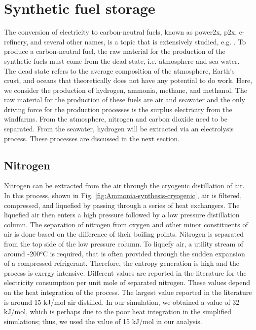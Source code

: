 \documentclass{ECOS_2021}
\begin{document}
\sffamily \section{Synthetic fuel storage}
\normalsize

The conversion of electricity to carbon-neutral fuels, known as power2x,
p2x, e-refinery, and several other names, is a topic that is extensively
studied, e.g. \cite{freiMethanolHydrogenCarrier2020b,ghaibPowertoMethaneStateoftheartReview2018,guerraMethaneProductionCombined2018,koponenReviewWaterElectrolysis2015,mendoza-hernandezExergyValorizationWater2019}.
To produce a carbon-neutral fuel, the raw material for the production
of the synthetic fuels must come from the dead state, i.e. atmosphere
and sea water. The dead state refers to the average composition of
the atmosphere, Earth's crust, and oceans that theoretically does
not have any potential to do work. Here, we consider the production
of hydrogen, ammonia, methane, and methanol. The raw material for
the production of these fuels are air and seawater and the only driving
force for the production processes is the surplus electricity from
the windfarms. From the atmosphere, nitrogen and carbon dioxide need
to be separated. From the seawater, hydrogen will be extracted via
an electrolysis process. These processes are discussed in the next
section.

\sffamily \subsection{Nitrogen}
\normalsize
Nitrogen can be extracted from the air through the cryogenic distillation
of air. In this process, shown in Fig. \ref{fig:Ammonia-synthesis-cryogenic},
air is filtered, compressed, and liquefied by passing through a series
of heat exchangers. The liquefied air then enters a high pressure
followed by a low pressure distillation column. The separation of
nitrogen from oxygen and other minor constituents of air is done based
on the difference of their boiling points. Nitrogen is separated from
the top side of the low pressure column. To liquefy air, a utility
stream of around -200$^{o}$C is required, that is often provided
through the sudden expansion of a compressed refrigerant. Therefore,
the entropy generation is high and the process is exergy intensive.
Different values are reported in the literature for the electricity
consumption per unit mole of separated nitrogen. These values depend
on the heat integration of the process. The largest value reported
in the literature is around 15 kJ/mol air distilled. In our simulation,
we obtained a value of 32 kJ/mol, which is perhaps due to the poor
heat integration in the simplified simulations; thus, we used the
value of 15 kJ/mol in our analysis.
\end{document}
